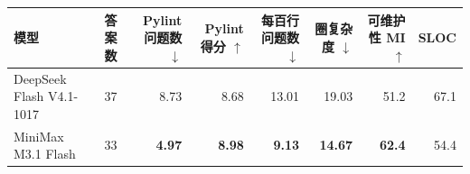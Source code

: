 \begin{tabular}{l*{7}{r}}
\toprule
模型 & 答案数 & Pylint 问题数 $\downarrow$ & Pylint 得分 $\uparrow$ & 每百行问题数 $\downarrow$ & 圈复杂度 $\downarrow$ & 可维护性 MI $\uparrow$ & SLOC \\
\midrule
DeepSeek Flash V4.1-1017 & 37 & 8.73 & 8.68 & 13.01 & 19.03 & 51.2 & 67.1 \\
MiniMax M3.1 Flash & 33 & \textbf{4.97} & \textbf{8.98} & \textbf{9.13} & \textbf{14.67} & \textbf{62.4} & 54.4 \\
\bottomrule
\end{tabular}
